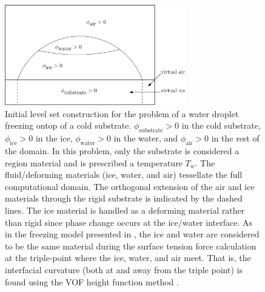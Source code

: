 \documentclass[preprint,12pt]{Definitions/elsarticle}
\begin{document}
\begin{figure}[H]
	\includegraphics[width=0.7\textwidth]{freezingdrop.eps}
	\caption{Initial level set construction for the problem of a water droplet freezing ontop of a cold substrate. $\phi_{\mbox{substrate}}>0$ in the cold substrate,
		$\phi_{\mbox{ice}}>0$ in the ice,
		$\phi_{\mbox{water}}>0$ in the water,
		and $\phi_{\mbox{air}}>0$ in the rest of the domain. In this problem, only the substrate is considered a region material and is prescribed a temperature $T_{w}$. The fluid/deforming materials (ice, water, and air) tessellate the full computational domain. The orthogonal extension of the air and ice materials through the rigid substrate is indicated by the dashed lines. The ice material is handled as a deforming material rather than rigid since phase change occurs at the ice/water interface. As in the freezing model presented in \cite{lyu2021hybrid}, the ice and water are considered to be the same material during the surface tension force calculation at the triple-point where the ice, water, and air meet. That is, the interfacial curvature (both at and away from the triple point) is found using the VOF height function method \cite{CumminsFrancoisKothe2005,sussman2003second}.
	}
	\label{ice_levelset}
\end{figure}   
\unskip
\end{document}

